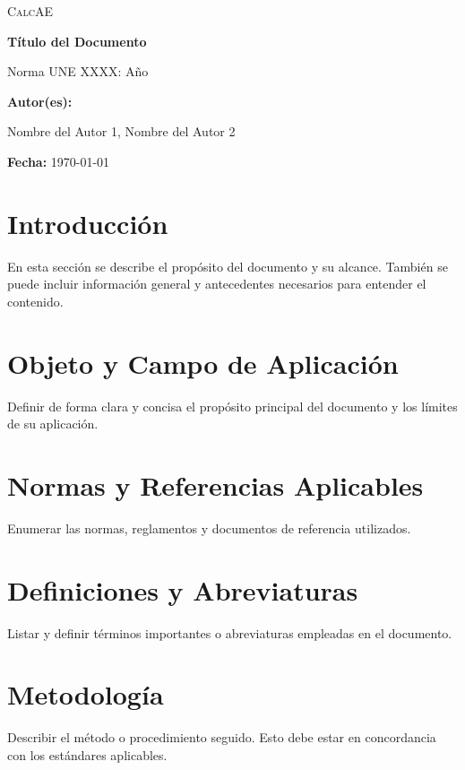 \documentclass[a4paper,12pt]{article}
\begin{document}
\begin{Form}


\begin{titlepage}
    \centering
    {\scshape\LARGE CalcAE \par}
    \vspace{1cm}
    {\Huge\bfseries Título del Documento \par}
    \vspace{2cm}
    {\Large Norma UNE XXXX: Año \par}
    \vspace{1cm}
    \vfill
    \textbf{Autor(es):}\par
    Nombre del Autor 1, Nombre del Autor 2\par
    \vspace{0.5cm}
    \textbf{Fecha:} \today \par
\end{titlepage}

\tableofcontents
\newpage

\section{Introducción}
En esta sección se describe el propósito del documento y su alcance. También se puede incluir información general y antecedentes necesarios para entender el contenido.

\section{Objeto y Campo de Aplicación}
Definir de forma clara y concisa el propósito principal del documento y los límites de su aplicación.

\section{Normas y Referencias Aplicables}
Enumerar las normas, reglamentos y documentos de referencia utilizados.

\section{Definiciones y Abreviaturas}
Listar y definir términos importantes o abreviaturas empleadas en el documento.

\section{Metodología}
Describir el método o procedimiento seguido. Esto debe estar en concordancia con los estándares aplicables.


\end{Form}
\end{document}
